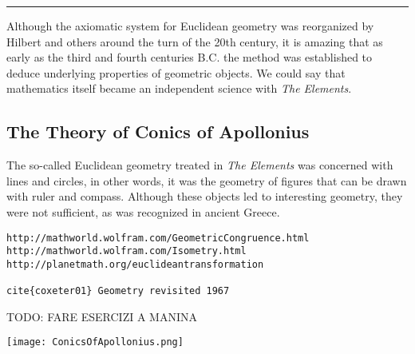 \noindent
{\color{red} \rule{\linewidth}{0.5mm} }

Although the axiomatic system for Euclidean geometry was reorganized by Hilbert and others around the turn of the 20th century, it is amazing that as early as the third and fourth centuries B.C. the method was established to deduce underlying properties of geometric objects. We could say that mathematics itself became an independent science with \emph{The Elements}.

\subsection{The Theory of Conics of Apollonius}
The so-called Euclidean geometry treated in \emph{The Elements} was concerned with lines and circles, in other words, it was the geometry of figures that can be drawn with ruler and compass. Although these objects led to interesting geometry, they were not sufficient, as was recognized in ancient Greece. 

\begin{verbatim}
http://mathworld.wolfram.com/GeometricCongruence.html
http://mathworld.wolfram.com/Isometry.html
http://planetmath.org/euclideantransformation

cite{coxeter01} Geometry revisited 1967

\end{verbatim}
TODO: FARE ESERCIZI A MANINA

\texttt{[image: ConicsOfApollonius.png]}